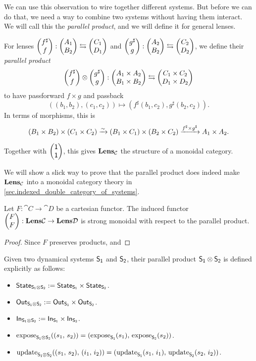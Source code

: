 \documentclass[DynamicalBook]{subfiles}
\begin{document}
We can use this observation to wire together different systems. But before we
can do that, we need a way to combine two systems without having them interact.
We will call this the \emph{parallel product}, and we will define it for general
lenses.

\begin{definition}
  For lenses $\begin{pmatrix}{f^{\sharp}} \\ {f} \end{pmatrix} : \begin{pmatrix}{A_1} \\ {B_2} \end{pmatrix} \leftrightarrows \begin{pmatrix}{C_1} \\ {D_1} \end{pmatrix}$ and
  $\begin{pmatrix}{g^{\sharp}} \\ {g} \end{pmatrix} : \begin{pmatrix}{A_2} \\ {B_2} \end{pmatrix} \leftrightarrows \begin{pmatrix}{C_2} \\ {D_2} \end{pmatrix}$, we
  define their \emph{parallel product} $$\begin{pmatrix}{f^{\sharp}} \\ {f} \end{pmatrix} \otimes
  \begin{pmatrix}{g^{\sharp}} \\ {g} \end{pmatrix} : \begin{pmatrix}{A_1 \times A_2} \\ {B_1 \times B_2} \end{pmatrix} \leftrightarrows
  \begin{pmatrix}{C_1 \times C_2} \\ {D_1 \times D_2} \end{pmatrix}$$
  to have passforward $f \times g$ and passback
  $$((b_1, b_2), (c_1, c_2)) \mapsto (f^{\sharp}(b_1, c_2), g^{\sharp}(b_2, c_2)).$$
  In terms of morphisms, this is
  $$(B_1 \times B_2) \times (C_1 \times C_2) \xrightarrow{\sim} (B_1 \times C_1) \times
  (B_2 \times C_2) \xrightarrow{f^{\sharp} \times g^{\sharp}} A_1 \times A_2.$$

  Together with $\begin{pmatrix}{\mathsf{1}} \\ {\mathsf{1}} \end{pmatrix}$, this gives $\textbf{Lens}_{\mathcal{C}}$ the
  structure of a monoidal category.
\end{definition}

\begin{remark}
  We will show a slick way to prove that the parallel product does indeed make
  $\textbf{Lens}_{\mathcal{C}}$ into a monoidal category theory in \cref{sec.indexed_double_category_of_systems}.
\end{remark}


\begin{proposition}\label{prop.lens_functoriality_monoidal}
Let $F : \cat{C} \to \cat{D}$ be a cartesian functor. The induced functor
$\begin{pmatrix}{F} \\ {F} \end{pmatrix} : \textbf{Lens}{\mathcal{C}} \to \textbf{Lens}{\mathcal{D}}$ is strong monoidal
with respect to the parallel product.
\end{proposition}
\begin{proof}
  Since $F$ preserves products, and 
\end{proof}

Given two dynamical systems $\mathsf{S_1}$ and $\mathsf{S_2}$, their parallel product
$\mathsf{S_1} \otimes \mathsf{S_2}$ is defined explicitly as follows:
\begin{itemize}
\item $\mathsf{State}_{\mathsf{S_1 \otimes S_2}} := \mathsf{State}_{\mathsf{S_1}} \times \mathsf{State}_{\mathsf{S_2}}$.
\item $\mathsf{Out}_{\mathsf{S_1 \otimes S_2}} := \mathsf{Out}_{\mathsf{S_1}} \times \mathsf{Out}_{\mathsf{S_2}}$.
\item $\mathsf{In}_{\mathsf{S_1 \otimes S_2}} := \mathsf{In}_{\mathsf{S_1}} \times \mathsf{In}_{\mathsf{S_2}}$.
\item $\mathrm{expose}_{\mathsf{S_1 \otimes S_2}}((s_1,\, s_2)) = (\mathrm{expose}_{\mathsf{S_1}}(s_1),\, \mathrm{expose}_{\mathsf{S_2}}(s_2))$.
\item $\mathrm{update}_{\mathsf{S_1 \otimes S_2}}((s_1,\, s_2),\, (i_1,\, i_2)) =
  (\mathrm{update}_{\mathsf{S_1}}(s_1,\, i_1),\, \mathrm{update}_{\mathsf{S_2}}(s_2,\, i_2))$.
\end{itemize}
\end{document}
